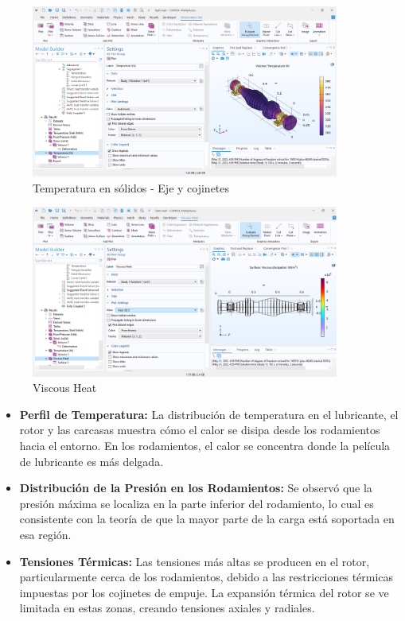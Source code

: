 \documentclass{article}
\theoremstyle{mytheoremstyle}
\theoremstyle{mytheoremstyle}
\theoremstyle{myproblemstyle}
\begin{document}
            \begin{figure}[H]
              \centering
              \includegraphics[width=0.9\textwidth]{temp_solidos.png}
              \caption{Temperatura en sólidos - Eje y cojinetes}
              \label{fig:comsol_temp_solidos_eje_cojinetes} %
            \end{figure}

             \begin{figure}[H]
              \centering
              \includegraphics[width=0.9\textwidth]{visheat.png}
              \caption{Viscous Heat}
              \label{fig:comsol_viscous_heat} %
            \end{figure}

            \begin{itemize}
              \item \textbf{Perfil de Temperatura:} La distribución de temperatura en el lubricante, el rotor y las carcasas muestra cómo el calor se disipa desde los rodamientos hacia el entorno. En los rodamientos, el calor se concentra donde la película de lubricante es más delgada.
              \item \textbf{Distribución de la Presión en los Rodamientos:} Se observó que la presión máxima se localiza en la parte inferior del rodamiento, lo cual es consistente con la teoría de que la mayor parte de la carga está soportada en esa región.
              \item \textbf{Tensiones Térmicas:} Las tensiones más altas se producen en el rotor, particularmente cerca de los rodamientos, debido a las restricciones térmicas impuestas por los cojinetes de empuje. La expansión térmica del rotor se ve limitada en estas zonas, creando tensiones axiales y radiales.
            \end{itemize}
\end{document}
